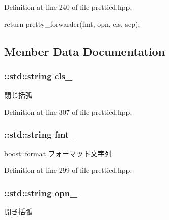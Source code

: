 \-Definition at line 240 of file prettied.\-hpp.


\begin{DoxyCode}
            {
                return pretty_forwarder(fmt, opn, cls, sep);
            }
\end{DoxyCode}


\subsection{\-Member \-Data \-Documentation}
\hypertarget{structyuh_1_1range__detail_1_1pretty__forwarder_a91d9929bdbd7f866ff9823f657a36d35}{
\subsubsection[{cls\-\_\-}]{\setlength{\rightskip}{0pt plus 5cm}\-::std\-::string {\bf cls\-\_\-}}}\label{db/d79/structyuh_1_1range__detail_1_1pretty__forwarder_a91d9929bdbd7f866ff9823f657a36d35}
閉じ括弧 

\-Definition at line 307 of file prettied.\-hpp.

\hypertarget{structyuh_1_1range__detail_1_1pretty__forwarder_a10e6f92b15963cf8b984dcd448cb88cc}{
\subsubsection[{fmt\-\_\-}]{\setlength{\rightskip}{0pt plus 5cm}\-::std\-::string {\bf fmt\-\_\-}}}\label{db/d79/structyuh_1_1range__detail_1_1pretty__forwarder_a10e6f92b15963cf8b984dcd448cb88cc}
boost\-::format フォーマット文字列 

\-Definition at line 299 of file prettied.\-hpp.

\hypertarget{structyuh_1_1range__detail_1_1pretty__forwarder_a18de53e582d18b754d97ebc4c23a24f2}{
\subsubsection[{opn\-\_\-}]{\setlength{\rightskip}{0pt plus 5cm}\-::std\-::string {\bf opn\-\_\-}}}\label{db/d79/structyuh_1_1range__detail_1_1pretty__forwarder_a18de53e582d18b754d97ebc4c23a24f2}
開き括弧 

